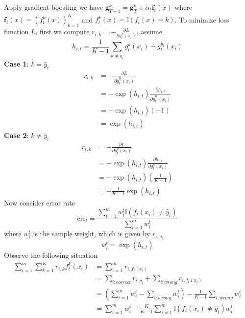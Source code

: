 \documentclass[12pt,a4paper]{article}
\begin{document}
Apply gradient boosting we have $\mathbf{g}_{T+1}^{k} = \mathbf{g}_{T}^{k}+\alpha_{t}\mathbf{f}_{t}(x)$ where $\mathbf{f}_{t}(x) = (f_{t}^{k}(x))_{k=1}^{K}$ and $f_{t}^{k}(x) = \mathbb{I} (f_{t}(x) = k)$.
To minimize loss function $L$, first we compute $r_{i,k} = -\frac{\partial L}{\partial g_{t}^{k}(x_{i})}$, assume $$h_{i,t} = \frac{1}{K-1}\sum_{k\neq \hat{y}_{i}}g_{t}^{k}(x_{i})-g_{t}^{\hat{y}_{i}}(x_{i})$$
\textbf{Case 1}: $k = \hat{y}_{i}$
\begin{align*}
    r_{i,k} 
        &= -\frac{\partial L}{\partial g_{t}^{\hat{y}_{i}}(x_{i})}\\
        &= -\exp(h_{i,t}) \frac{\partial h_{i,t}}{\partial g_{t}^{\hat{y}_{i}}(x_{i})}\\
        &= -\exp(h_{i,t})(-1)\\ 
        &= \exp(h_{i,t})
\end{align*}
\textbf{Case 2}: $k \neq \hat{y}_{i}$
\begin{align*}
    r_{i,k} 
        &= -\frac{\partial L}{\partial g_{t}^{k}(x_{i})}\\
        &= -\exp(h_{i,t}) \frac{\partial h_{i,t}}{\partial g_{t}^{k}(x_{i})}\\
        &= -\exp(h_{i,t})(\frac{1}{K-1})\\ 
        &= -\frac{1}{K-1}\exp(h_{i,t})
\end{align*}
Now consider error rate 
\begin{equation*}
    \text{err}_{t} = \frac{\sum_{i=1}^{m}w_{i}^{t}\mathbb{I} (f_{t}(x_i)\neq \hat{y}_{i})}{\sum_{i=1}^{m}w_{i}^{t}}
\end{equation*}
where $w_{i}^{t}$ is the sample weight, which is given by $r_{i, \hat{y}_{i}}$
\begin{equation*}
    w_{i}^{t} = \exp(h_{i,t})
\end{equation*}
Observe the following situation
\begin{equation*}
    \begin{split}
        \sum_{i=1}^{m}\sum_{k=1}^{K}r_{i,k}f_{t}^{k}(x_i) 
            &= \sum_{i=1}^{m} r_{i,f_{t}(x_{i})}\\
            &= \sum_{i:correct} r_{i,\hat{y}_{i}} + \sum_{i:wrong} r_{i,f_{t}(x_{i})}\\
            &= (\sum_{i=1}^{m} w_{i}^{t} - \sum_{i:wrong} w_{i}^{t}) - \frac{1}{K-1} \sum_{i:wrong} w_{i}^{t}\\
            &= \sum_{i=1}^{m} w_{i}^{t} - \frac{K}{K-1} \sum_{i=1}^{m} \mathbb{I} (f_{t}(x_i)\neq \hat{y}_{i})w_{i}^{t}
    \end{split}
\end{equation*} 
\end{document}
